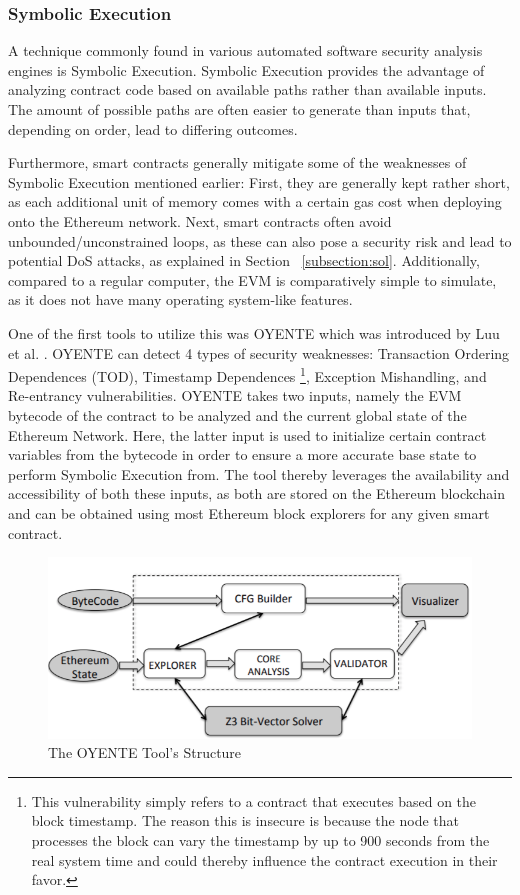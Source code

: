 \documentclass[letterpaper,twocolumn,10pt]{article}
\begin{document}
\subsubsection{Symbolic Execution}
A technique commonly found in various automated software security analysis engines is Symbolic Execution. Symbolic Execution provides the advantage of analyzing contract code based on available paths rather than available inputs. The amount of possible paths are often easier to generate than inputs that, depending on order, lead to differing outcomes.

Furthermore, smart contracts generally mitigate some of the weaknesses of Symbolic Execution mentioned earlier: First, they are generally kept rather short, as each additional unit of memory comes with a certain gas cost when deploying onto the Ethereum network. Next, smart contracts often avoid unbounded/unconstrained loops, as these can also pose a security risk and lead to potential DoS attacks, as explained in Section ~\ref{subsection:sol}. Additionally, compared to a regular computer, the EVM is comparatively simple to simulate, as it does not have many operating system-like features.


One of the first tools to utilize this was OYENTE which was introduced by Luu et al. \cite{luu_chu_olickel_saxena_hobor_2016}. OYENTE can detect 4 types of security weaknesses: Transaction Ordering Dependences (TOD), Timestamp Dependences \footnote{This vulnerability simply refers to a contract that executes based on the block timestamp. The reason this is insecure is because the node that processes the block can vary the timestamp by up to 900 seconds from the real system time and could thereby influence the contract execution in their favor.}, Exception Mishandling, and Re-entrancy vulnerabilities. OYENTE takes two inputs, namely the EVM bytecode of the contract to be analyzed and the current global state of the Ethereum Network. Here, the latter input is used to initialize certain contract variables from the bytecode in order to ensure a more accurate base state to perform Symbolic Execution from. The tool thereby leverages the availability and accessibility of both these inputs, as both are stored on the Ethereum blockchain and can be obtained using most Ethereum block explorers for any given smart contract.

\begin{figure}
\begin{center}
\includegraphics[scale=0.35]{oyente}
\end{center}
\caption{\label{fig:oyente} The OYENTE Tool's Structure \cite{luu_chu_olickel_saxena_hobor_2016}}
\end{figure}
\end{document}
